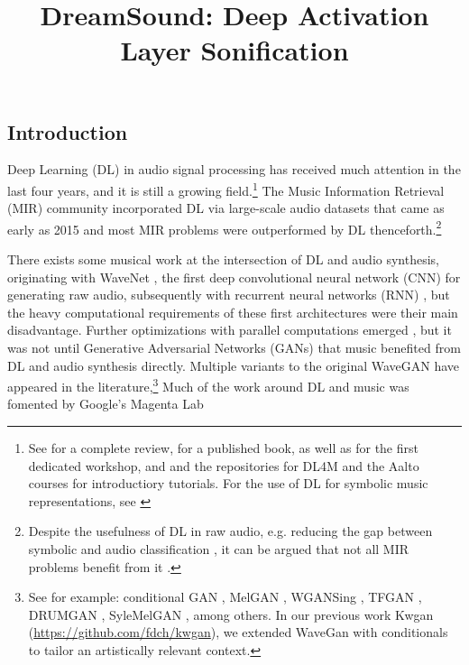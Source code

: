 \documentclass[a4paper,10pt,oneside]{article}
\title{DreamSound: Deep Activation Layer Sonification}
\begin{document}
\ninept
\maketitle

\begin{sloppy}
\begin{abstract}

\end{abstract}

\section{Introduction}
\label{sec:intro}

Deep Learning (DL) in audio signal processing has received much attention in the last four years, and it is still a growing field.\footnote{See \cite{2019Purwins} for a complete review, \cite{Briot2017} for a published book, as well as\cite{herremans2017proceedings} for the first dedicated workshop, and \cite{choi2017tutorial} and the repositories for DL4M \cite{Bayle2017} and the Aalto courses \cite{Koray2018} for introductiory tutorials. For the use of DL for symbolic music representations, see \cite{yang2017midinet, Briot2018AnET, rachel_manzelli_2018_1492375, hao_wen_dong_2018_1492377, mittal2021symbolic, MuseGanPapers}}  The Music Information Retrieval (MIR) community incorporated DL via large-scale audio datasets that came as early as 2015 \cite{2015piczak,2017audioset,engel2017neural} and most MIR problems were outperformed by DL thenceforth.\footnote{Despite the usefulness of DL in raw audio, e.g. reducing the gap between symbolic and audio classification \cite{sergio_oramas_2017_1417427}, it can be argued that not all MIR problems benefit from it \cite{harsh_verma_2019_3527866}.} 

There exists some musical work at the intersection of DL and audio synthesis, originating with WaveNet \cite{oord2016wavenet}, the first deep convolutional neural network (CNN) for generating raw audio, subsequently with recurrent neural networks (RNN) \cite{mehri2017samplernn, kalchbrenner2018efficient}, but the heavy computational requirements of these first architectures were their main disadvantage. Further optimizations with parallel computations emerged \cite{oord2017parallel,lamtharn_hantrakul_2019_3527860,yamamoto2020parallel,song2021improved}, but it was not until Generative Adversarial Networks (GANs) \cite{Bollepalli_2017, 2017Kaneko, pascual2017segan, 2019waveglow, tian2020tfgan, Liu_2020} that music benefited from DL and audio synthesis directly. Multiple variants to the original WaveGAN \cite{donahue2018adversarial} have appeared in the literature,\footnote{See for example: conditional GAN \cite{2018Lee}, MelGAN \cite{NEURIPS2019_6804c9bc, jang2021universal}, WGANSing \cite{Chandna_2019}, TFGAN \cite{tian2020tfgan}, DRUMGAN \cite{javier_nistal_2020_4245504}, SyleMelGAN \cite{mustafa2021stylemelgan}, among others. In our previous work Kwgan (\url{https://github.com/fdch/kwgan}), we  extended WaveGan with conditionals to tailor an artistically relevant context.} Much of the work around DL and music was fomented by Google's Magenta Lab \cite{adam_roberts_2019_4285266}


\end{sloppy}
\end{document}
